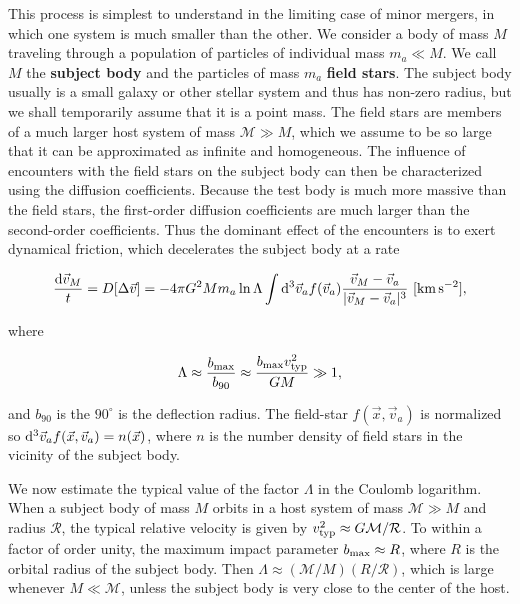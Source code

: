 \documentclass[a4paper,10pt]{article}
\begin{document}
This process is simplest to understand in the limiting case of minor mergers, in which one system is much smaller than the other. We consider a body of mass $M$ traveling through a population of particles of individual mass $m_a\ll M$. We call $M$ the \textbf{subject body} and the particles of mass $m_a$ \textbf{field stars}. The subject body usually is a small galaxy or other stellar system and thus has non-zero radius, but we shall temporarily assume that it is a point mass. The field stars are members of a much larger host system of mass $\mathcal{M}\gg M$, which we assume to be so large that it can be approximated as infinite and homogeneous. The influence of encounters with the field stars on the subject body can then be characterized using the diffusion coefficients. Because the test body is much more massive than the field stars, the first-order diffusion coefficients are much larger than the second-order coefficients. Thus the dominant effect of the encounters is to exert dynamical friction, which decelerates the subject body at a rate

\begin{align*}
    \frac{{\rm d}\vec{v}_M}{{\rm }t} = D[\Delta\vec{v}] = -4\pi G^2Mm_a\ln\Lambda \int{\rm d}^3\vec{v}_af(\vec{v}_a) \frac{\vec{v}_M-\vec{v}_a}{|\vec{v}_M-\vec{v}_a|^3} ~ [{\rm km\,s^{-2}}],
\end{align*}

{\noindent}where

\begin{align*}
    \Lambda \approx \frac{b_{\rm max}}{b_{90}} \approx \frac{b_{\rm max}v_{\rm typ}^2}{GM} \gg 1,
\end{align*}

{\noindent}and $b_{90}$ is the $90^\circ$ is the deflection radius. The field-star $f(\vec{x},\vec{v}_a)$ is normalized so ${\rm d}^3\vec{v}_af(\vec{x},\vec{v}_a)=n(\vec{x})$, where $n$ is the number density of field stars in the vicinity of the subject body.

{\noindent}We now estimate the typical value of the factor $\Lambda$ in the Coulomb logarithm. When a subject body of mass $M$ orbits in a host system of mass $\mathcal{M}\gg M$ and radius $\mathcal{R}$, the typical relative velocity is given by $v_{\rm typ}^2\approx G\mathcal{M}/\mathcal{R}$. To within a factor of order unity, the maximum impact parameter $b_{\rm max}\approx R$, where $R$ is the orbital radius of the subject body. Then $\Lambda\approx(\mathcal{M}/M)(R/\mathcal{R})$, which is large whenever $M\ll\mathcal{M}$, unless the subject body is very close to the center of the host.
\end{document}
